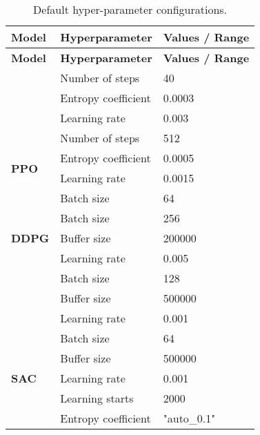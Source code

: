\begin{longtable}{|l|l|p{8cm}|}
    \hline
    \textbf{Model} & \textbf{Hyperparameter} & \textbf{Values / Range} \\ \midrule
    \endfirsthead

    \hline
    \textbf{Model} & \textbf{Hyperparameter} & \textbf{Values / Range} \\ \midrule
    \endhead

    \caption{Default hyper-parameter configurations.}
    \label{tab:default_hyperparameters}
    \endfoot

    \multirow{3}{*}{\textbf{A2C}}
    & Number of steps & 40 \\
    & Entropy coefficient & 0.0003 \\ 
    & Learning rate & 0.003 \\ \hline


    \multirow{4}{*}{\textbf{PPO}}
    & Number of steps & 512 \\ 
    & Entropy coefficient & 0.0005 \\ 
    & Learning rate & 0.0015 \\ 
    & Batch size & 64 \\ \hline

    \multirow{3}{*}{\textbf{DDPG}}
    & Batch size & 256 \\ 
    & Buffer size & 200000 \\ 
    & Learning rate & 0.005 \\ \hline

    \pagebreak
    \multirow{3}{*}{\textbf{TD3}}
    & Batch size & 128 \\ 
    & Buffer size & 500000 \\ 
    & Learning rate & 0.001 \\ \hline

    \multirow{5}{*}{\textbf{SAC}}
    & Batch size & 64 \\ 
    & Buffer size & 500000 \\ 
    & Learning rate & 0.001 \\ 
    & Learning starts & 2000 \\ 
    & Entropy coefficient & "auto\_0.1" \\ \hline
    
\end{longtable}